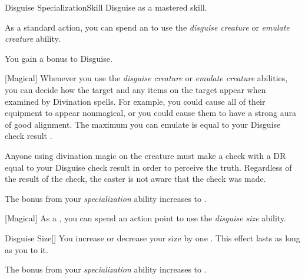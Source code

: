     \begin{feat}{Disguise Specialization}{Skill}
        \featpre Disguise as a mastered skill.

         As a standard action, you can spend an  to use the \textit{disguise creature} or \textit{emulate creature} ability.

         You gain a  bonus to Disguise.

        [Magical] Whenever you use the \textit{disguise creature} or \textit{emulate creature} abilities, you can decide how the target and any items on the target appear when examined by Divination spells.
        For example, you could cause all of their equipment to appear nonmagical, or you could cause them to have a strong aura of good alignment.
        The maximum  you can emulate is equal to your Disguise check result .

        Anyone using divination magic on the creature must make a  check with a DR equal to your Disguise check result in order to perceive the truth.
        Regardless of the result of the check, the caster is not aware that the check was made.

         The bonus from your \textit{specialization} ability increases to .

        [Magical] As a , you can spend an action point to use the \textit{disguise size} ability.
        \begin{ability}{Disguise Size}[]
            You increase or decrease your size by one .
            This effect lasts as long as you  to it.
        \end{ability}

         The bonus from your \textit{specialization} ability increases to .
    \end{feat}

